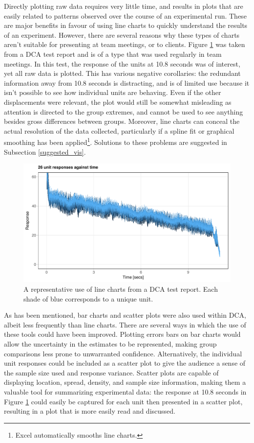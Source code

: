 \documentclass[11pt,a4paper,article]{memoir} %
\begin{document}
Directly plotting raw data requires very little time, and results in plots that are easily related to patterns observed over the course of an experimental run. These are major benefits in favour of using line charts to quickly understand the results of an experiment. However, there are several reasons why these types of charts aren't suitable for presenting at team meetings, or to clients. Figure \ref{fig:line_chart} was taken from a DCA test report and is of a type that was used regularly in team meetings. In this test, the response of the units at 10.8 seconds was of interest, yet all raw data is plotted. This has various negative corollaries: the redundant information away from 10.8 seconds is distracting, and is of limited use because it isn't possible to see how individual units are behaving.  Even if the other displacements were relevant, the plot would still be somewhat misleading as attention is directed to the group extremes, and cannot be used to see anything besides gross differences between groups. Moreover, line charts can conceal the actual resolution of the data collected, particularly if a spline fit or graphical smoothing has been applied\footnote{Excel automatically smooths line charts.}. Solutions to these problems are suggested in Subsection \ref{suggested_vis}.
\begin{figure}[h!]
\includegraphics[width=\textwidth]{imitation_line_chart_2.pdf}
\caption{A representative use of line charts from a DCA test report. Each shade of blue corresponds to a unique unit.}
\label{fig:line_chart}
\end{figure}

As has been mentioned, bar charts and scatter plots were also used within DCA, albeit less frequently than line charts. There are several ways in which the use of these tools could have been improved. Plotting errors bars on bar charts would allow the uncertainty in the estimates to be represented, making group comparisons less prone to unwarranted confidence. Alternatively, the individual unit responses could be included as a scatter plot to give the audience a sense of the sample size used and response variance. Scatter plots are capable of displaying location, spread, density, and sample size information, making them a valuable tool for summarizing experimental data: the response at 10.8 seconds in Figure \ref{fig:line_chart} could easily be captured for each unit then presented in a scatter plot, resulting in a plot that is more easily read and discussed.
\end{document}
